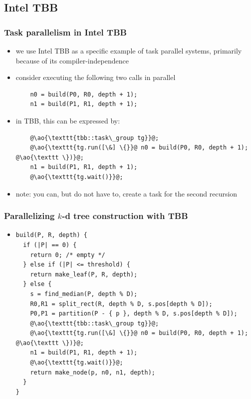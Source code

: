 \documentclass[12pt,dvipdfmx]{beamer}
\newcommand{\ao}[1]{{\color{blue}#1}}
\begin{document}
\iffalse
\subsection{Intel TBB}
\begin{frame}[fragile]
\frametitle{Task parallelism in Intel TBB}
\begin{itemize}
\item we use Intel TBB as a specific example of task parallel
  systems, primarily because of its compiler-independence
\item consider executing the following two calls in parallel
\begin{lstlisting}
    n0 = build(P0, R0, depth + 1);
    n1 = build(P1, R1, depth + 1);
\end{lstlisting}
\item in TBB, this can be expressed by:
\begin{lstlisting}
    @\ao{\texttt{tbb::task\_group tg}}@;
    @\ao{\texttt{tg.run([\&] \{}}@ n0 = build(P0, R0, depth + 1); @\ao{\texttt \})}@;
    n1 = build(P1, R1, depth + 1);
    @\ao{\texttt{tg.wait()}}@;
\end{lstlisting}

\item note: you can, but do not have to, create a task for the second recursion
\end{itemize}
\end{frame}


\begin{frame}[fragile]
\frametitle{Parallelizing $k$-d tree construction with TBB}
\begin{itemize}
\item []
\begin{lstlisting}
build(P, R, depth) {
  if (|P| == 0) {
    return 0; /* empty */
  } else if (|P| <= threshold) {
    return make_leaf(P, R, depth);
  } else {
    s = find_median(P, depth % D);
    R0,R1 = split_rect(R, depth % D, s.pos[depth % D]);
    P0,P1 = partition(P - { p }, depth % D, s.pos[depth % D]);
    @\ao{\texttt{tbb::task\_group tg}}@;
    @\ao{\texttt{tg.run([\&] \{}}@ n0 = build(P0, R0, depth + 1); @\ao{\texttt \})}@;
    n1 = build(P1, R1, depth + 1);
    @\ao{\texttt{tg.wait()}}@;
    return make_node(p, n0, n1, depth);
  }
}
\end{lstlisting}
\end{itemize}
\end{frame}
\end{document}
